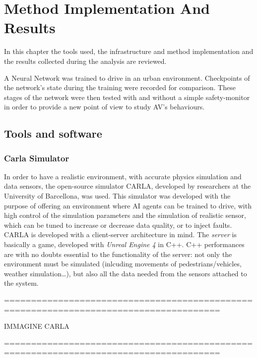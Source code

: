 \chapter{Method Implementation And Results}

In this chapter the tools used, the infrastructure and method implementation and the results collected during the analysis are reviewed.

A Neural Network was trained to drive in an urban environment. Checkpoints of the network's state during the training were recorded for comparison. These stages of the network were then tested with and without a simple safety-monitor in order to provide a new point of view to study AV's behaviours.

\section{Tools and software}

\subsection{Carla Simulator}

In order to have a realistic environment, with accurate physics simulation and data sensors, the open-source simulator CARLA\cite{carla}, developed by researchers at the University of Barcellona, was used. This simulator was developed with the purpose of offering an environment where AI agents can be trained to drive, with high control of the simulation parameters and the simulation of realistic sensor, which can be tuned to increase or decrease data quality, or to inject faults.\newline
CARLA is developed with a client-server architecture in mind. The \textsl{server} is basically a game, developed with \textsl{Unreal Engine 4} in C++. C++ performances are with no doubts essential to the functionality of the server: not only the environment must be simulated (inlcuding movements of pedestrians/vehicles, weather simulation\dots), but also all the data needed from the sensors attached to the system.\newline


======================================================================================

IMMAGINE CARLA

======================================================================================

